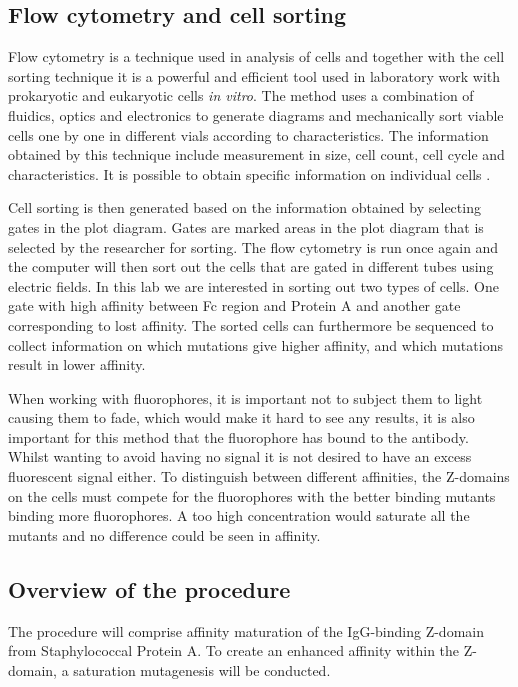 \documentclass{article}
\begin{document}
\begin{multicols}{2}
	\subsection{Flow cytometry and cell sorting}
	Flow cytometry is a technique used in analysis of cells and together with the cell sorting technique it is a powerful and efficient tool used in laboratory work with prokaryotic and eukaryotic cells \textit{in vitro}. The method uses a combination of fluidics, optics and electronics to generate diagrams and mechanically sort viable cells one by one in different vials according to characteristics. The information obtained by this technique include measurement in size, cell count, cell cycle and characteristics. It is possible to obtain specific information on individual cells \cite{flow}.
	
	Cell sorting is then generated based on the information obtained by selecting gates in the plot diagram. Gates are marked areas in the plot diagram that is selected by the researcher for sorting. The flow cytometry is run once again and the computer will then sort out the cells that are gated in different tubes using electric fields. In this lab we are interested in sorting out two types of cells. One gate with high affinity between Fc region and Protein A and another gate corresponding to lost affinity. The sorted cells can furthermore be sequenced to collect information on which mutations give higher affinity, and which mutations result in lower affinity.
	
	When working with fluorophores, it is important not to subject them to light causing them to fade, which would make it hard to see any results, it is also important for this method that the fluorophore has bound to the antibody. Whilst wanting to avoid having no signal it is not desired to have an excess fluorescent signal either. To distinguish between different affinities, the Z-domains on the cells must compete for the fluorophores with the better binding mutants binding more fluorophores. A too high concentration would saturate all the mutants and no difference could be seen in affinity.
	
	
	\subsection{Overview of the procedure}
	The procedure will comprise affinity maturation of the IgG-binding Z-domain from Staphylococcal Protein A. To create an enhanced affinity within the Z-domain, a saturation mutagenesis will be conducted.
	

\end{multicols}
\end{document}
